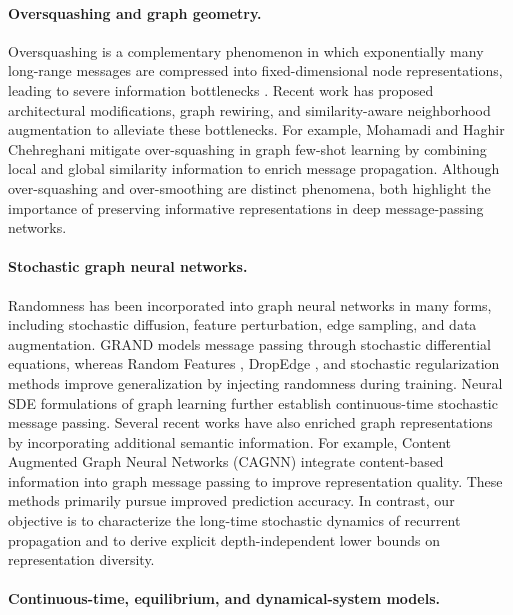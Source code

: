 \documentclass{article}
\begin{document}
\paragraph{Oversquashing and graph geometry.}

Oversquashing is a complementary phenomenon in which exponentially many
long-range messages are compressed into fixed-dimensional node
representations, leading to severe information bottlenecks
\cite{alon2021bottleneck,topping2022understanding,digiovanni2023oversquashing}.
Recent work has proposed architectural modifications, graph rewiring, and
similarity-aware neighborhood augmentation to alleviate these bottlenecks.
For example, Mohamadi and Haghir Chehreghani
\cite{mohamadi2025oversquashing} mitigate over-squashing in graph few-shot
learning by combining local and global similarity information to enrich
message propagation.
Although over-squashing and over-smoothing are distinct phenomena, both
highlight the importance of preserving informative representations in deep
message-passing networks.

\paragraph{Stochastic graph neural networks.}

Randomness has been incorporated into graph neural networks in many forms,
including stochastic diffusion,
feature perturbation,
edge sampling,
and data augmentation.
GRAND
\cite{chamberlain2021grand}
models message passing through stochastic differential equations,
whereas Random Features
\cite{sato2021random},
DropEdge
\cite{rong2020dropedge},
and stochastic regularization methods
\cite{godwin2022simple}
improve generalization by injecting randomness during training.
Neural SDE formulations of graph learning
\cite{zhuang2020sdgnn}
further establish continuous-time stochastic message passing.
Several recent works have also enriched graph representations by
incorporating additional semantic information.
For example, Content Augmented Graph Neural Networks
(CAGNN) \cite{nasrabadi2025}
integrate content-based information into graph message passing to
improve representation quality.
These methods primarily pursue improved prediction accuracy.
In contrast,
our objective is to characterize the long-time stochastic dynamics of
recurrent propagation and to derive explicit depth-independent lower
bounds on representation diversity.

\paragraph{Continuous-time, equilibrium, and dynamical-system models.}
\end{document}
